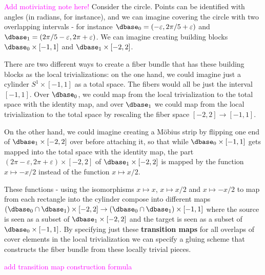\documentclass[journal]{IEEEtran}
\newcommand{\note}[1]{\textcolor{magenta}{#1}}
\theoremstyle{definition}
\theoremstyle{remark}
\begin{document}
\note{Add motiviating note here!}
Consider the circle. Points can be identified with angles (in radians, for instance), and we can imagine covering the circle with two overlapping intervals - for instance $\dbase_0=(-\varepsilon, 2\pi/5+\varepsilon)$ and $\dbase_1=(2\pi/5-\varepsilon, 2\pi+\varepsilon)$. We can imagine creating building blocks $\dbase_0\times[-1,1]$ and $\dbase_1\times[-2,2]$.

There are two different ways to create a fiber bundle that has these building blocks as the local trivializations: on the one hand, we could imagine just a cylinder $S^1\times[-1,1]$ as a total space. The fibers would all be just the interval $[-1,1]$. Over $\dbase_0$, we could map from the local trivialization to the total space with the identity map, and over $\dbase_1$ we could map from the local trivialization to the total space by rescaling the fiber space $[-2,2]\to[-1,1]$.

On the other hand, we could imagine creating a Möbius strip by flipping one end of $\dbase_1\times[-2,2]$ over before attaching it, so that while $\dbase_0\times[-1,1]$ gets mapped into the total space with the identity map, the part $(2\pi-\varepsilon,2\pi+\varepsilon)\times[-2,2]$ of $\dbase_1\times[-2,2]$ is mapped by the function $x\mapsto -x/2$ instead of the function $x\mapsto x/2$.

These functions - using the isomorphisms $x\mapsto x$, $x\mapsto x/2$ and $x\mapsto -x/2$ to map from each rectangle into the cylinder compose into different maps $(\dbase_0\cap\dbase_1)\times[-2,2]\to(\dbase_0\cap\dbase_1)\times[-1,1]$ where the source is seen as a subset of $\dbase_1\times[-2,2]$ and the target is seen as a subset of $\dbase_0\times[-1,1]$. By specifying just these \textbf{transition maps} for all overlaps of cover elements in the local trivialization we can specify a gluing scheme that constructs the fiber bundle from these locally trivial pieces.


\note{add transition map construction formula}
\end{document}
